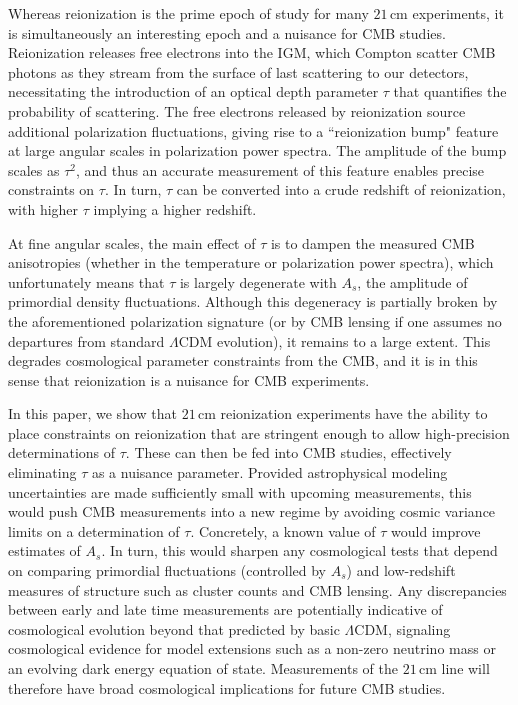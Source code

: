 \documentclass[twocolumn,aps,prd,nofootinbib,showpacs,superscriptaddress]{revtex4-1}
\begin{document}
Whereas reionization is the prime epoch of study for many $21\,\textrm{cm}$ experiments, it is simultaneously an interesting epoch and a nuisance for CMB studies. Reionization releases free electrons into the IGM, which Compton scatter CMB photons as they stream from the surface of last scattering to our detectors, necessitating the introduction of an optical depth parameter $\tau$ that quantifies the probability of scattering. The free electrons released by reionization source additional polarization fluctuations, giving rise to a ``reionization bump" feature at large angular scales in polarization power spectra. The amplitude of the bump scales as $\tau^2$, and thus an accurate measurement of this feature enables precise constraints on $\tau$. In turn, $\tau$ can be converted into a crude redshift of reionization, with higher $\tau$ implying a higher redshift.

At fine angular scales, the main effect of $\tau$ is to dampen the measured CMB anisotropies (whether in the temperature or polarization power spectra), which unfortunately means that $\tau$ is largely degenerate with $A_s$, the amplitude of primordial density fluctuations. Although this degeneracy is partially broken by the aforementioned polarization signature (or by CMB lensing if one assumes no departures from standard $\Lambda$CDM evolution), it remains to a large extent. This degrades cosmological parameter constraints from the CMB, and it is in this sense that reionization is a nuisance for CMB experiments.

In this paper, we show that $21\,\textrm{cm}$ reionization experiments have the ability to place constraints on reionization that are stringent enough to allow high-precision determinations of $\tau$. These can then be fed into CMB studies, effectively eliminating $\tau$ as a nuisance parameter. Provided astrophysical modeling uncertainties are made sufficiently small with upcoming measurements, this would push CMB measurements into a new regime by avoiding cosmic variance limits on a determination of $\tau$. Concretely, a known value of $\tau$ would improve estimates of $A_s$. In turn, this would sharpen any cosmological tests that depend on comparing primordial fluctuations (controlled by $A_s$) and low-redshift measures of structure such as cluster counts and CMB lensing. Any discrepancies between early and late time measurements are potentially indicative of cosmological evolution beyond that predicted by basic $\Lambda$CDM, signaling cosmological evidence for model extensions such as a non-zero neutrino mass or an evolving dark energy equation of state. Measurements of the $21\,\textrm{cm}$ line will therefore have broad cosmological implications for future CMB studies.
\end{document}
